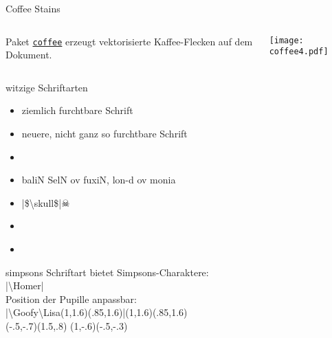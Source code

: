 \documentclass[
	vorläufig=false,
	datum=2016-12-16,
	titel={Witziges und Obskures},
	web=false,
]{../tex/latexkurs-slides}
\begin{document}
\begin{frame}{Coffee Stains}
	\begin{columns}
		\begin{column}{.3\textwidth}
			Paket \alert{\href{http://hanno-rein.de/archives/349}{\texttt{coffee}}} erzeugt vektorisierte Kaffee-Flecken auf dem Dokument.
		\end{column}
		\begin{column}{.6\textwidth}
			\texttt{[image: coffee4.pdf]}
		\end{column}
	\end{columns}
\end{frame}



\begin{frame}{witzige Schriftarten}
	\begin{itemize}[<+->]
		\item {}\hfill{ ziemlich furchtbare Schrift}
		\item {}\hfill{\comicneue neuere, nicht ganz so furchtbare Schrift}
		\item {}%
		\item {}\hfill{\cirth baliN SelN ov fuxiN, lon-d ov monia}
		\vspace{.2ex}

		\item {}\hfill{|\$\textbackslash skull\$|\quad\Large$\skull$}
		\item {}\hfill{\Large{}}
		\vspace{-.8em}

		\item {}\hfill\scalebox{.6}{\dancers Sher­lock Holmes}\hspace{-2ex}\,
	\end{itemize}
\end{frame}

\begin{frame}{simpsons}
Schriftart  bietet Simpsons-Charaktere:\\[-.5em]
|\textbackslash Homer| \hfill\Homer{} \\[2em]\pause\pause
Position der Pupille anpassbar:\\[-.5em]
|\textbackslash Goofy\textbackslash Lisa(1,1.6)(.85,1.6)|\hfill\Goofy\Lisa(1,1.6)(.85,1.6) \\[2em]
\pause
\hfill \Goofy\Marge(-.5,-.7)(1.5,.8) \Goofy\Maggie(1,-.6)(-.5,-.3) \quad \Left\Burns\hfill\,
\end{frame}
\end{document}
